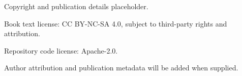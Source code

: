 \thispagestyle{empty}
\null\vfill
\noindent Copyright and publication details placeholder.\par
\noindent Book text license: CC BY-NC-SA 4.0, subject to third-party rights and attribution.\par
\noindent Repository code license: Apache-2.0.\par
\noindent Author attribution and publication metadata will be added when supplied.\par
\clearpage
